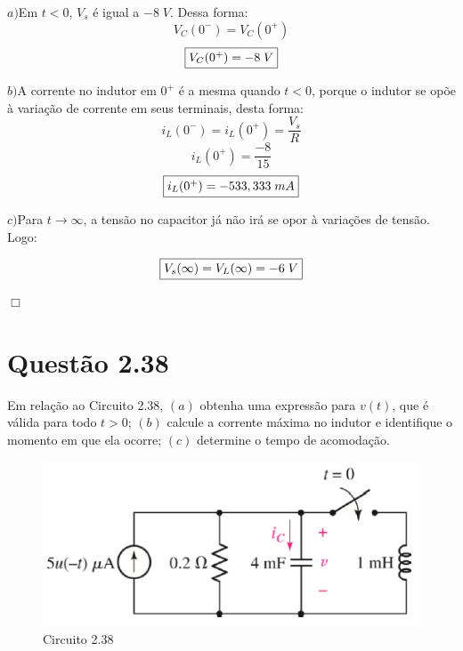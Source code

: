 \documentclass[
	12pt,				%
	oneside,			%
	a4paper,			%
	english,			%
	french,				%
	spanish,			%
	brazil				%
	]{abntex2}
\begin{document}
$a)$Em $t<0$, $V_s$ é igual a $-8\;V$. Dessa forma:
$$V_C(0^-)=V_C(0^+)$$
\begin{equation}
    \fbox{$V_C(0^+)=-8\;V$}
\end{equation}


$b)$A corrente no indutor em $0^+$ é a mesma quando $t<0$, porque o indutor se opõe à variação de corrente em seus terminais, desta forma:
$$i_L(0^-)=i_L(0^+)=\dfrac{V_s}{R}$$
$$i_L(0^+)=\dfrac{-8}{15}$$
\begin{equation}
    \fbox{$i_L(0^+)=-533,333\;mA$}
\end{equation}

$c)$Para $t \rightarrow \infty$, a tensão no capacitor já não irá se opor à variações de tensão. Logo:

\begin{equation}
    \fbox{$V_s(\infty) = V_L(\infty)=-6\;V$}
\end{equation}

\begin{flushright}
    $\Box$
\end{flushright}
\newpage


\section*{Questão 2.38}
Em relação ao Circuito 2.38, $(a)$ obtenha uma expressão para $v(t)$, que é válida para todo $t > 0$; $(b)$ calcule a corrente máxima no indutor e identifique o momento em que ela ocorre; $(c)$ determine o tempo de acomodação. 
\begin{figure}[htb]
	\centering
	\includegraphics[scale=0.7]{2-38.PNG}
	\caption{Circuito 2.38}
\end{figure}
\end{document}
